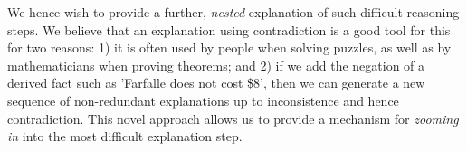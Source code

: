 We hence wish to provide a further, \textit{nested} explanation of such difficult reasoning steps. We believe that an explanation using contradiction is a good tool for this for two reasons: 1) it is often used by people when solving puzzles, as well as by mathematicians when proving theorems; and 2) if we add the negation of a derived fact such as 'Farfalle does not cost \$8', then we can generate a new sequence of non-redundant explanations up to inconsistence and hence contradiction. 
This novel approach allows us to provide a mechanism for \emph{zooming in} into the most difficult explanation step.










